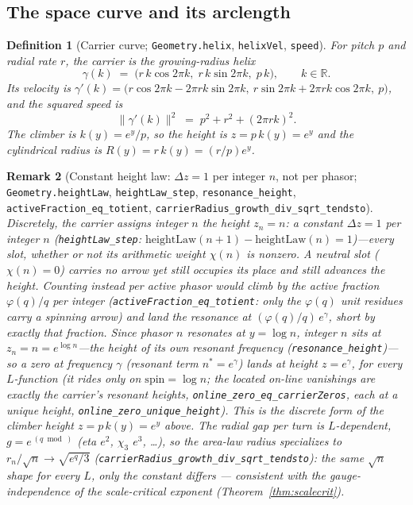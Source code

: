 \documentclass[11pt]{article}
\newtheorem{definition}{Definition}[section]
\newtheorem{remark}[definition]{Remark}
\newcommand{\R}{\mathbb{R}}
\newcommand{\code}[1]{\texttt{#1}}
\begin{document}
\subsection{The space curve and its arclength}

\begin{definition}[Carrier curve; \code{Geometry.helix}, \code{helixVel}, \code{speed}]\label{def:helix}
For pitch $p$ and radial rate $r$, the carrier is the growing-radius helix
\[
  \gamma(k) \;=\; \bigl(r\,k\cos 2\pi k,\; r\,k\sin 2\pi k,\; p\,k\bigr),\qquad k\in\R .
\]
Its velocity is $\gamma'(k)=\bigl(r\cos2\pi k-2\pi r k\sin2\pi k,\ r\sin2\pi k+2\pi r k\cos2\pi k,\ p\bigr)$,
and the squared speed is
\[
  \|\gamma'(k)\|^2 \;=\; p^2+r^2+(2\pi r k)^2 .
\]
The \emph{climber} is $k(y)=e^{y}/p$, so the height is $z=p\,k(y)=e^{y}$ and the cylindrical radius
is $R(y)=r\,k(y)=(r/p)e^{y}$.
\end{definition}

\begin{remark}[Constant height law: $\Delta z=1$ per integer $n$, not per phasor; \code{Geometry.heightLaw}, \code{heightLaw\_step}, \code{resonance\_height}, \code{activeFraction\_eq\_totient}, \code{carrierRadius\_growth\_div\_sqrt\_tendsto}]\label{rem:height}
Discretely, the carrier assigns integer $n$ the height $z_n=n$: a constant $\Delta z=1$
\emph{per integer $n$} (\code{heightLaw\_step}: $\mathrm{heightLaw}(n+1)-\mathrm{heightLaw}(n)=1$)---every
slot, whether or not its arithmetic weight $\chi(n)$ is nonzero.
A neutral slot ($\chi(n)=0$) carries no arrow yet still occupies its place and still advances the
height. Counting instead per \emph{active} phasor would climb by the active fraction
$\varphi(q)/q$ per integer (\code{activeFraction\_eq\_totient}: only the $\varphi(q)$ unit residues carry a
spinning arrow) and land the resonance at $(\varphi(q)/q)\,e^{\gamma}$, short by exactly
that fraction. Since phasor $n$ resonates at $y=\log n$, integer $n$ sits at $z_n=n=e^{\log n}$---the
height of its own resonant frequency (\code{resonance\_height})---so a zero at frequency $\gamma$ (resonant term
$n^\ast=e^{\gamma}$) lands at height $z=e^{\gamma}$, for every $L$-function (it rides only on
$\mathrm{spin}=\log n$; the located on-line vanishings are exactly the carrier's resonant heights,
\code{online\_zero\_eq\_carrierZeros}, each at a unique height, \code{online\_zero\_unique\_height}). This is the discrete form of the climber height $z=p\,k(y)=e^{y}$ above.
The radial gap per turn is $L$-dependent, $g=e^{\,(q\bmod{})}$ (eta $e^2$, $\chi_3$ $e^3$, \dots), so the
area-law radius specializes to $r_n/\sqrt n\to\sqrt{e^{q}/3}$ (\code{carrierRadius\_growth\_div\_sqrt\_tendsto}):
the same $\sqrt n$ shape for every $L$, only the constant differs --- consistent with the
gauge-independence of the scale-critical exponent (Theorem~\ref{thm:scalecrit}).
\end{remark}
\end{document}
